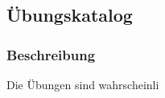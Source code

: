 \documentclass[FIPLY_base.tex]{subfiles}
\author{Gerald Irsiegler}
\date{26. Februar 2016}
\begin{document}
\subsection{Übungskatalog}

\subsubsection{Beschreibung}
Die Übungen sind wahrscheinli
\end{document}
